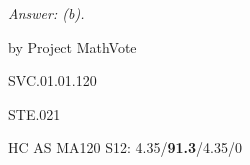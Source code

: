 {\it Answer: (b).}

\medskip
by Project MathVote

SVC.01.01.120

STE.021

HC AS MA120 S12: 4.35/{\bf91.3}/4.35/0  \\

